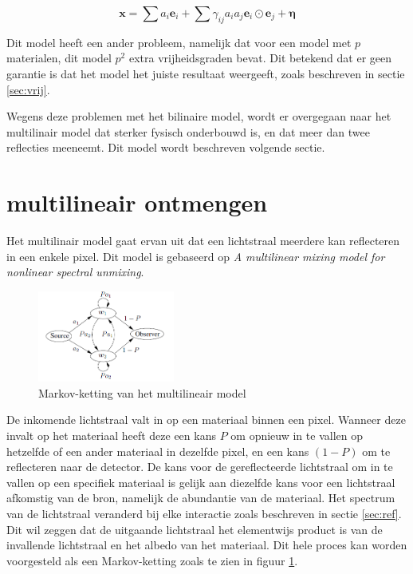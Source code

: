 \documentclass[12pt]{report}
\begin{document}
\begin{equation}
\bm{x} = \sum a_i \bm{e}_i + \sum \gamma_{ij} a_i a_j \bm{e}_i \odot \bm{e}_j + \bm{\eta}
\end{equation}

Dit model heeft een ander probleem, namelijk dat voor een model met $p$ materialen, dit model $p^2$ extra vrijheidsgraden bevat. Dit betekend dat er geen garantie is dat het model het juiste resultaat weergeeft, zoals beschreven in sectie \ref{sec:vrij}. 

Wegens deze problemen met het bilinaire model, wordt er overgegaan naar het multilinair model dat sterker fysisch onderbouwd is, en dat meer dan twee reflecties meeneemt. Dit model wordt beschreven volgende sectie.

\section{multilineair ontmengen} \label{sec:multi}

Het multilinair model gaat ervan uit dat een lichtstraal meerdere kan reflecteren in een enkele pixel. Dit model is gebaseerd op \textit{A multilinear mixing model for nonlinear spectral unmixing}\cite{mlinmix}. 

\begin{figure}
\includegraphics[width=0.4\textwidth]{multi.PNG}
\caption{Markov-ketting van het multilineair model \label{fig:multi}}
\end{figure}

De inkomende lichtstraal valt in op een materiaal binnen een pixel. Wanneer deze invalt op het materiaal heeft deze een kans $P$ om opnieuw in te vallen op hetzelfde of een ander materiaal in dezelfde pixel, en een kans $(1 - P)$ om te reflecteren naar de detector. De kans voor de gereflecteerde lichtstraal om in te vallen op een specifiek materiaal is gelijk aan diezelfde kans voor een lichtstraal afkomstig van de bron, namelijk de abundantie van de materiaal. Het spectrum van de lichtstraal veranderd bij elke interactie zoals beschreven in sectie \ref{sec:ref}. Dit wil zeggen dat de uitgaande lichtstraal  het elementwijs product is van de invallende lichtstraal en het albedo van het materiaal.
Dit hele proces kan worden voorgesteld als een Markov-ketting zoals te zien in figuur \ref{fig:multi}.
\end{document}
